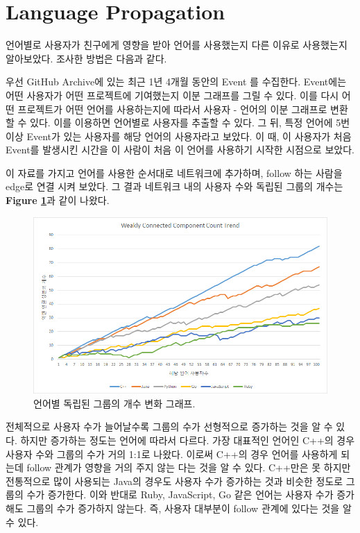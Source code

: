 \documentclass[10pt, a4paper, titlepage]{article}
\begin{document}
\section{Language Propagation}

언어별로 사용자가 친구에게 영향을 받아 언어를 사용했는지 다른 이유로 사용했는지 알아보았다. 조사한 방법은 다음과 같다.

우선 GitHub Archive에 있는 최근 1년 4개월 동안의 Event 를 수집한다. Event에는 어떤 사용자가 어떤 프로젝트에 기여했는지 이분 그래프를 그릴 수 있다. 이를 다시 어떤 프로젝트가 어떤 언어를 사용하는지에 따라서 사용자 - 언어의 이분 그래프로 변환할 수 있다. 이를 이용하면 언어별로 사용자를 추출할 수 있다. 그 뒤, 특정 언어에 5번 이상 Event가 있는 사용자를 해당 언어의 사용자라고 보았다. 이 때, 이 사용자가 처음 Event를 발생시킨 시간을 이 사람이 처음 이 언어를 사용하기 시작한 시점으로 보았다.

이 자료를 가지고 언어를 사용한 순서대로 네트워크에 추가하며, follow 하는 사람을 edge로 연결 시켜 보았다. 그 결과 네트워크 내의 사용자 수와 독립된 그룹의 개수는 {\bf Figure \ref{fig:cctrend}}과 같이 나왔다.

\begin{figure}
\includegraphics[width=\textwidth]{image11}
\caption{언어별 독립된 그룹의 개수 변화 그래프.}
\label{fig:cctrend}
\end{figure}

전체적으로 사용자 수가 늘어날수록 그룹의 수가 선형적으로 증가하는 것을 알 수 있다. 하지만 증가하는 정도는 언어에 따라서 다르다. 가장 대표적인 언어인 C++의 경우 사용자 수와 그룹의 수가 거의 1:1로 나왔다. 이로써 C++의 경우 언어를 사용하게 되는데 follow 관계가 영향을 거의 주지 않는 다는 것을 알 수 있다. C++만은 못 하지만 전통적으로 많이 사용되는 Java의 경우도 사용자 수가 증가하는 것과 비슷한 정도로 그룹의 수가 증가한다. 이와 반대로 Ruby, JavaScript, Go 같은 언어는 사용자 수가 증가해도 그룹의 수가 증가하지 않는다. 즉, 사용자 대부분이 follow 관계에 있다는 것을 알 수 있다.
\end{document}
